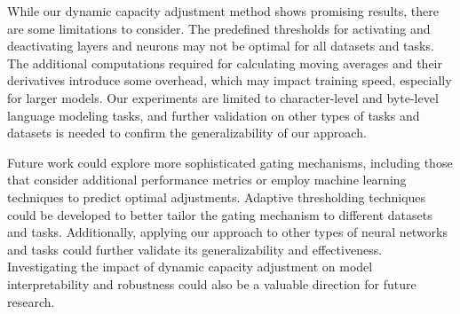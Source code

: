 \documentclass{article} %
\begin{document}
While our dynamic capacity adjustment method shows promising results, there are some limitations to consider. The predefined thresholds for activating and deactivating layers and neurons may not be optimal for all datasets and tasks. The additional computations required for calculating moving averages and their derivatives introduce some overhead, which may impact training speed, especially for larger models. Our experiments are limited to character-level and byte-level language modeling tasks, and further validation on other types of tasks and datasets is needed to confirm the generalizability of our approach.

Future work could explore more sophisticated gating mechanisms, including those that consider additional performance metrics or employ machine learning techniques to predict optimal adjustments. Adaptive thresholding techniques could be developed to better tailor the gating mechanism to different datasets and tasks. Additionally, applying our approach to other types of neural networks and tasks could further validate its generalizability and effectiveness. Investigating the impact of dynamic capacity adjustment on model interpretability and robustness could also be a valuable direction for future research.



\end{document}
